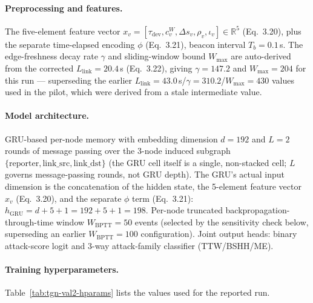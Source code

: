 \paragraph{Preprocessing and features.}
The five-element feature vector
$x_v = [\tau_{\text{dev}}, c_v^{W}, \Delta s_v, \rho_v, \iota_v] \in \mathbb{R}^5$
(Eq.~3.20), plus the separate time-elapsed encoding $\phi$ (Eq.~3.21),
beacon interval $T_b=0.1$\,s. The edge-freshness decay rate $\gamma$ and
sliding-window bound $W_{\max}$ are auto-derived from the corrected
$L_{\text{link}}=20.4$\,s (Eq.~3.22), giving $\gamma=147.2$ and
$W_{\max}=204$ for this run — superseding the earlier
$L_{\text{link}}=43.0$\,s/$\gamma=310.2$/$W_{\max}=430$ values used in the
pilot, which were derived from a stale intermediate value.

\paragraph{Model architecture.}
GRU-based per-node memory with embedding dimension $d=192$ and $L=2$
rounds of message passing over the 3-node induced subgraph
$\{\text{reporter}, \text{link\_src}, \text{link\_dst}\}$ (the GRU cell
itself is a single, non-stacked cell; $L$ governs message-passing rounds,
not GRU depth). The GRU's actual input dimension is the concatenation of
the hidden state, the 5-element feature vector $x_v$ (Eq.~3.20), and the
separate $\phi$ term (Eq.~3.21):
$h_{\text{GRU}} = d + 5 + 1 = 192 + 5 + 1 = 198$. Per-node truncated
backpropagation-through-time window $W_{\text{BPTT}}=50$ events (selected
by the sensitivity check below, superseding an earlier
$W_{\text{BPTT}}=100$ configuration). Joint output heads: binary
attack-score logit and 3-way attack-family classifier (TTW/BSHH/ME).

\paragraph{Training hyperparameters.}
Table~\ref{tab:tgn-val2-hparams} lists the values used for the reported run.

